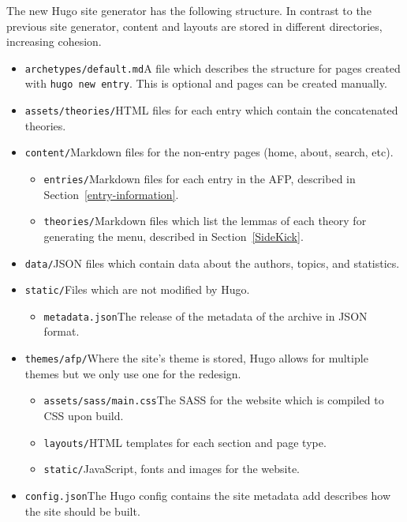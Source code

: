 \documentclass[bsc,frontabs,oneside,singlespacing,parskip,deptreport,logo]{infthesis}
\newcommand{\toupdate}[1]{} %
\begin{document}
The new Hugo site generator has the following structure. In contrast to the previous site generator, content and layouts are stored in different directories, increasing cohesion. 

\begin{itemize}
    \item \texttt{archetypes/default.md}\quad A file which describes the structure for pages created with \verb|hugo new entry|. This is optional and pages can be created manually.
    \item \texttt{assets/theories/}\quad HTML files for each entry which contain the concatenated theories.
    \item \texttt{content/}\quad Markdown files for the non-entry pages (home, about, search, etc).
    \begin{itemize}
        \item \texttt{entries/}\quad Markdown files for each entry in the AFP, described in Section~\ref{entry-information}.
        \item \texttt{theories/}\quad Markdown files which list the lemmas of each theory for generating the menu, described in Section~\ref{SideKick}.
    \end{itemize}
    \item \texttt{data/}\quad JSON files which contain data about the authors, topics, and statistics.
    \item \texttt{static/}\quad Files which are not modified by Hugo.
    \begin{itemize}
        \item \texttt{metadata.json}\quad The release of the metadata of the archive in JSON format.
    \end{itemize}
    \item \texttt{themes/afp/}\quad Where the site's theme is stored, Hugo allows for multiple themes but we only use one for the redesign.
    \begin{itemize}
        \item \texttt{assets/sass/main.css}\quad The SASS for the website which is compiled to CSS upon build.
        \item \texttt{layouts/}\quad HTML templates for each section and page type.
        \item \texttt{static/}\quad JavaScript, fonts and images for the website.
        \toupdate{}
    \end{itemize}
    \item \texttt{config.json}\quad The Hugo config contains the site metadata add describes how the site should be built.
\end{itemize}
\end{document}
